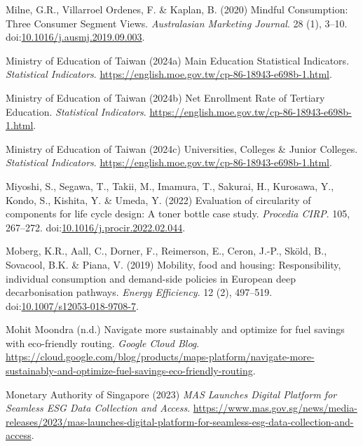 \documentclass[
  letterpaper,
  DIV=11,
  numbers=noendperiod]{scrartcl}
\newlength{\cslhangindent}
\newenvironment{CSLReferences}[2] %
 {\begin{list}{}{%
  \setlength{\itemindent}{0pt}
  \setlength{\leftmargin}{0pt}
  \setlength{\parsep}{0pt}
  \ifodd #1
   \setlength{\leftmargin}{\cslhangindent}
   \setlength{\itemindent}{-1\cslhangindent}
  \fi
  \setlength{\itemsep}{#2\baselineskip}}}
 {\end{list}}
\begin{document}
\begin{CSLReferences}{0}{1}
Milne, G.R., Villarroel Ordenes, F. \& Kaplan, B. (2020) Mindful
{Consumption}: {Three Consumer Segment Views}. \emph{Australasian
Marketing Journal}. 28 (1), 3--10.
doi:\href{https://doi.org/10.1016/j.ausmj.2019.09.003}{10.1016/j.ausmj.2019.09.003}.

Ministry of Education of Taiwan (2024a) Main {Education Statistical
Indicators}. \emph{Statistical Indicators}.
\url{https://english.moe.gov.tw/cp-86-18943-e698b-1.html}.

Ministry of Education of Taiwan (2024b) Net {Enrollment Rate} of
{Tertiary Education}. \emph{Statistical Indicators}.
\url{https://english.moe.gov.tw/cp-86-18943-e698b-1.html}.

Ministry of Education of Taiwan (2024c) Universities, {Colleges} \&
{Junior Colleges}. \emph{Statistical Indicators}.
\url{https://english.moe.gov.tw/cp-86-18943-e698b-1.html}.

Miyoshi, S., Segawa, T., Takii, M., Imamura, T., Sakurai, H., Kurosawa,
Y., Kondo, S., Kishita, Y. \& Umeda, Y. (2022) Evaluation of circularity
of components for life cycle design: {A} toner bottle case study.
\emph{Procedia CIRP}. 105, 267--272.
doi:\href{https://doi.org/10.1016/j.procir.2022.02.044}{10.1016/j.procir.2022.02.044}.

Moberg, K.R., Aall, C., Dorner, F., Reimerson, E., Ceron, J.-P., Sköld,
B., Sovacool, B.K. \& Piana, V. (2019) Mobility, food and housing:
Responsibility, individual consumption and demand-side policies in
{European} deep decarbonisation pathways. \emph{Energy Efficiency}. 12
(2), 497--519.
doi:\href{https://doi.org/10.1007/s12053-018-9708-7}{10.1007/s12053-018-9708-7}.

Mohit Moondra (n.d.) Navigate more sustainably and optimize for fuel
savings with eco-friendly routing. \emph{Google Cloud Blog}.
\url{https://cloud.google.com/blog/products/maps-platform/navigate-more-sustainably-and-optimize-fuel-savings-eco-friendly-routing}.

Monetary Authority of Singapore (2023) \emph{{MAS Launches Digital
Platform} for {Seamless ESG Data Collection} and {Access}}.
\url{https://www.mas.gov.sg/news/media-releases/2023/mas-launches-digital-platform-for-seamless-esg-data-collection-and-access}.


\end{CSLReferences}
\end{document}
